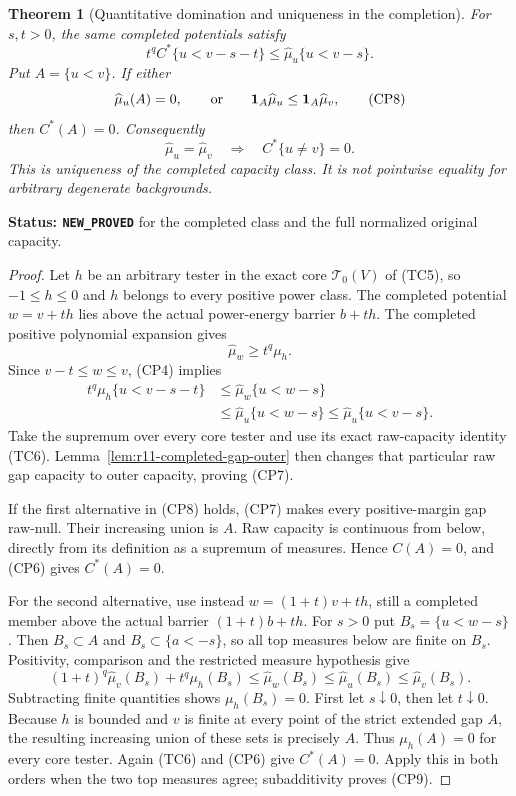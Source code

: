 \documentclass[11pt,a4paper]{article}
\numberwithin{equation}{section}
\newtheorem{theorem}{Theorem}[section]
\theoremstyle{definition}
\theoremstyle{remark}
\begin{document}
\begin{theorem}[Quantitative domination and uniqueness in the completion]
\label{thm:r11-completed-domination}
For $s,t>0$, the same completed potentials satisfy
\[
              t^q C^*\{u<v-s-t\}
                       \leq\widehat\mu_u\{u<v-s\}.
 \tag{CP7}
\]
Put $A=\{u<v\}$. If either
\[
       \widehat\mu_u(A)=0,
       \qquad\hbox{or}\qquad
       \mathbf1_A\widehat\mu_u
                              \leq\mathbf1_A\widehat\mu_v,
 \tag{CP8}
\]
then $C^*(A)=0$. Consequently
\[
    \widehat\mu_u=\widehat\mu_v
           \quad\Longrightarrow\quad C^*\{u\ne v\}=0.
 \tag{CP9}
\]
This is uniqueness of the completed capacity class. It is not
pointwise equality for arbitrary degenerate backgrounds.
\end{theorem}

\noindent\textbf{Status: \texttt{NEW\_PROVED}} for the completed
class and the full normalized original capacity.

\begin{proof}
Let $h$ be an arbitrary tester in the exact core
$\mathscr T_0(V)$ of (TC5), so $-1\leq h\leq0$ and $h$
belongs to every positive power class. The completed potential
$w=v+t h$ lies above the actual power-energy barrier $b+t h$.
The completed positive polynomial expansion gives
\[
                  \widehat\mu_w\geq t^q\mu_h.
\]
Since $v-t\leq w\leq v$, (CP4) implies
\[
 \begin{split}
 t^q\mu_h\{u<v-s-t\}
 &\leq\widehat\mu_w\{u<w-s\}\\
 &\leq\widehat\mu_u\{u<w-s\}
                 \leq\widehat\mu_u\{u<v-s\}.
 \end{split}
 \tag{CP10}
\]
Take the supremum over every core tester and use its exact
raw-capacity identity (TC6). Lemma~\ref{lem:r11-completed-gap-outer}
then changes that particular raw gap capacity to outer capacity,
proving (CP7).

If the first alternative in (CP8) holds, (CP7) makes every
positive-margin gap raw-null. Their increasing union is $A$.
Raw capacity is continuous from below, directly from its
definition as a supremum of measures. Hence $C(A)=0$, and
(CP6) gives $C^*(A)=0$.

For the second alternative, use instead
$w=(1+t)v+t h$, still a completed member above the actual
barrier $(1+t)b+t h$. For $s>0$ put $B_s=\{u<w-s\}$.
Then $B_s\subset A$ and $B_s\subset\{a<-s\}$, so all top
measures below are finite on $B_s$. Positivity, comparison and
the restricted measure hypothesis give
\[
 (1+t)^q\widehat\mu_v(B_s)+t^q\mu_h(B_s)
       \leq\widehat\mu_w(B_s)
       \leq\widehat\mu_u(B_s)
       \leq\widehat\mu_v(B_s).
 \tag{CP11}
\]
Subtracting finite quantities shows $\mu_h(B_s)=0$.
First let $s\downarrow0$, then let $t\downarrow0$.
Because $h$ is bounded and $v$ is finite at every point of
the strict extended gap $A$, the resulting increasing union
of these sets is precisely $A$. Thus $\mu_h(A)=0$ for every
core tester. Again (TC6) and (CP6) give $C^*(A)=0$.
Apply this in both orders when the two top measures agree;
subadditivity proves (CP9).
\end{proof}
\end{document}
